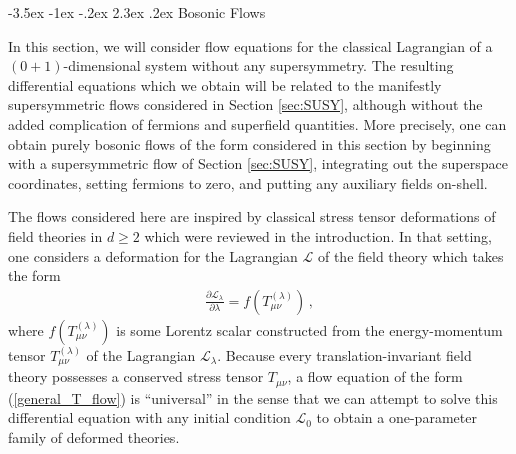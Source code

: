 \documentclass[12pt]{article}
\makeatletter
\numberwithin{equation}{section}
\renewcommand\section{\@startsection {section}{1}{\z@}%
                                   {-3.5ex \@plus -1ex \@minus -.2ex}%
                                   {2.3ex \@plus.2ex}%
                                   {\normalfont\large\bfseries}}
\makeatother
\begin{document}
\section{Bosonic Flows}\label{sec:bosonic}

In this section, we will consider flow equations for the classical Lagrangian of a $(0+1)$-dimensional system without any supersymmetry. The resulting differential equations which we obtain will be related to the manifestly supersymmetric flows considered in Section \ref{sec:SUSY}, although without the added complication of fermions and superfield quantities. More precisely, one can obtain purely bosonic flows of the form considered in this section by beginning with a supersymmetric flow of Section \ref{sec:SUSY}, integrating out the superspace coordinates, setting fermions to zero, and putting any auxiliary fields on-shell.

The flows considered here are inspired by classical stress tensor deformations of field theories in $d \geq 2$ which were reviewed in the introduction. In that setting, one considers a deformation for the Lagrangian $\mathcal{L}$ of the field theory which takes the form
%
\begin{align}\label{general_T_flow}
    \frac{\partial \mathcal{L}_\lambda}{\partial \lambda} = f \left( T_{\mu \nu}^{(\lambda)} \right) \, , 
\end{align}
%
where $f \left( T_{\mu \nu}^{(\lambda)} \right)$ is some Lorentz scalar constructed from the energy-momentum tensor $T_{\mu \nu}^{(\lambda)}$ of the Lagrangian $\mathcal{L}_\lambda$. Because every translation-invariant field theory possesses a conserved stress tensor $T_{\mu \nu}$, a flow equation of the form (\ref{general_T_flow}) is ``universal'' in the sense that we can attempt to solve this differential equation with any initial condition $\mathcal{L}_0$ to obtain a one-parameter family of deformed theories.
\end{document}
